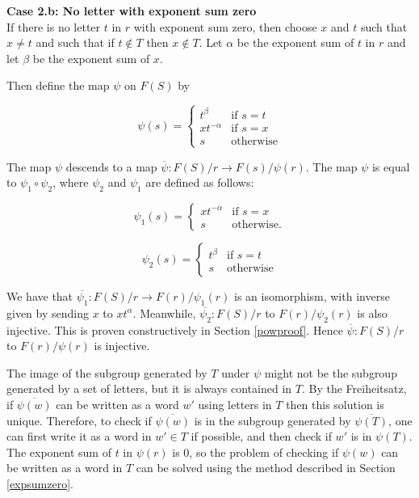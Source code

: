 \documentclass[11pt]{article} %
\theoremstyle{definition}
\theoremstyle{definition}
\theoremstyle{definition}
\theoremstyle{definition}
\theoremstyle{definition}
\theoremstyle{definition}
\begin{document}
\textbf{Case 2.b: No letter with exponent sum zero}\\

If there is no letter $t$ in $r$ with exponent sum zero, then choose $x$
and $t$ such that $x \ne t$ and such that if $t \notin T$ then $x \notin T$.
Let $\alpha$ be the exponent sum
of $t$ in $r$ and let $\beta$ be the exponent sum of $x$.

Then define the map $\psi$ on $F(S)$ by

\begin{equation}
  \psi(s) =
  \begin{cases}
     t^\beta & \text{if }s = t \\
     xt^{-\alpha} &\text{if } s = x \\
     s & \text{otherwise}
  \end{cases}
\end{equation}

The map $\psi$ descends to a map $\overline{\psi}: F(S) / r \to F(s) / \psi(r)$. The map
$\psi$ is equal to $\psi_1 \circ \psi_2$,
where $\psi_2$ and $\psi_1$ are defined as follows:

\begin{equation}
  \psi_1(s) =
  \begin{cases}
     xt^{-\alpha} &\text{if } s = x \\
     s & \text{otherwise.}
  \end{cases}
\end{equation}

\begin{equation}
  \psi_2(s) =
  \begin{cases}
     t^\beta & \text{if } s = t \\
     s & \text{otherwise}
  \end{cases}
\end{equation}

We have that $\overline{\psi_1}: F(S) / r \to F(r) / \psi_1(r)$ is an isomorphism, with inverse given by sending $x$ to $xt^\alpha$. Meanwhile,
$\overline{\psi_2}: F(S) / r$ to $F(r) / \psi_2(r)$
is also injective.
This is proven constructively in Section \ref{powproof}.
Hence $\overline{\psi}: F(S) / r$ to $F(r) / \psi(r)$ is injective.

The image of the subgroup generated
by $T$ under $\psi$ might not be the subgroup generated by a set of letters, but it is
always contained in $T$.
By the Freiheitsatz, if $\overline{\psi(w)}$ can be written
as a word $w'$ using letters in $T$ then this solution is unique.
Therefore, to check if $\overline{\psi(w)}$ is in the subgroup generated by
$\overline{\psi(T)}$, one can first write it as a word in $w' \in T $ if possible,
and then check if $w'$ is in $\psi(T)$.
The exponent sum of $t$ in $\psi(r)$ is $0$, so the problem of checking
if $\psi(w)$ can be written as a word in $T$ can be solved using
the method described in Section \ref{expsumzero}.
\end{document}
